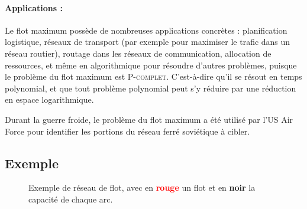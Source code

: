 \documentclass[a4paper]{article}
\begin{document}
\paragraph{Applications :} Le flot maximum possède de nombreuses applications concrètes : planification logistique, réseaux de transport (par exemple pour maximiser le trafic dans un réseau routier), routage dans les réseaux de communication, allocation de ressources, et même en algorithmique pour résoudre d’autres problèmes, puisque le problème du flot maximum est \textsc{P-complet}. C'est-à-dire qu'il se résout en temps polynomial, et que tout problème polynomial peut s'y réduire par une réduction en espace logarithmique\cite{GOLDSCHLAGER1982105}.

Durant la guerre froide, le problème du flot maximum a été utilisé par l'US Air Force pour identifier les portions du réseau ferré soviétique à cibler\cite{schrijver2002history}.
\subsection{Exemple}
\begin{figure}[H]
	\begin{center}
		\caption{Exemple de réseau de flot, avec en \textcolor{red}{\textbf{rouge}} un flot et en \textbf{noir} la capacité de chaque arc.}
	\end{center}
\end{figure}
\end{document}
